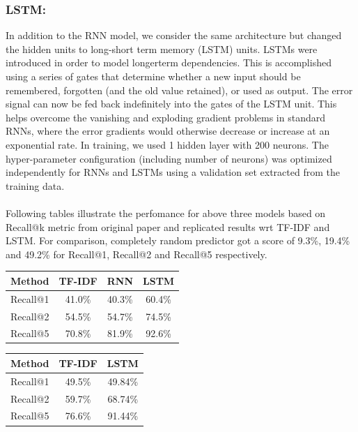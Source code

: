 \documentclass[letterpaper] {article} %
\begin{document}
\subsubsection{LSTM:} 
In addition to the RNN model, we consider the same architecture but changed the hidden units to long-short term memory (LSTM) units\cite{hochreiter1997long}. LSTMs were introduced in order to model longerterm dependencies. This is accomplished using a series of gates that determine whether a new input should be remembered, forgotten (and the old value retained), or used as output. The error signal can now be fed back indefinitely into the gates of the LSTM unit. This helps overcome the vanishing and exploding gradient problems in standard RNNs, where the error gradients would otherwise decrease or increase at an exponential rate. In training, we used 1 hidden layer with 200 neurons. The hyper-parameter configuration (including number of neurons) was optimized independently for RNNs and LSTMs using a validation set extracted from the training data.
\\\\
Following tables illustrate the perfomance for above three models based on Recall@k metric from original paper and replicated results wrt TF-IDF and LSTM. For comparison, completely random predictor got a score of 9.3\%, 19.4\% and 49.2\% for Recall@1, Recall@2 and Recall@5 respectively.
\begin{center}
	\begin{tabular}{ |c|c|c|c| } 
		\hline
		\textbf{Method} & \textbf{TF-IDF} & \textbf{RNN} & \textbf{LSTM} \\ \hline
		Recall@1 & 41.0\%  & 40.3\% & 60.4\% \\ \hline
		Recall@2 & 54.5\% & 54.7\% & 74.5\% \\ \hline
		Recall@5 & 70.8\% & 81.9\% & 92.6\% \\ \hline
	\end{tabular}
\end{center}
\begin{center}
	\begin{tabular}{ |c|c|c| } 
		\hline
		\textbf{Method} & \textbf{TF-IDF} & \textbf{LSTM} \\ \hline
		Recall@1 & 49.5\% & 49.84\% \\ \hline
		Recall@2 & 59.7\% & 68.74\% \\ \hline
		Recall@5 & 76.6\% & 91.44\% \\ \hline
	\end{tabular}
\end{center}
\end{document}
